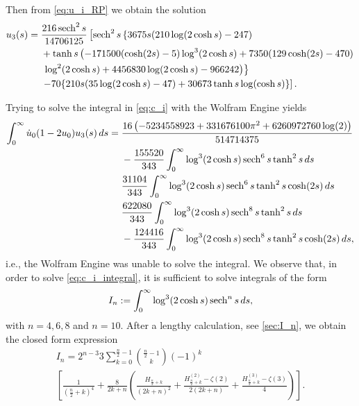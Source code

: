 Then from \cref{eq:u_i_RP} we obtain the solution
\begin{align*}
    u_3(s) ={}&
    \frac{216 \operatorname{sech}^2 s}{14706125}  
    \left[\operatorname{sech}^2 s  \left\{3675 s (210 \log (2 \cosh  s )-247) \right. \right. \\
              & +\tanh  s  \left(-171500 (\cosh (2 s)- 5) \log ^3(2 \cosh  s )+7350 (129 \cosh (2 s)-470) \right. \\
              & \left.\left. \log^2(2 \cosh  s )+4456830 \log (2 \cosh s)-966242\right)\right\} \\
              & \left.-70 \{210 s (35 \log (2 \cosh  s )-47)+30673 \tanh  s \log (\cosh  s )\}\right]
.\end{align*}

Trying to solve the integral in \cref{eq:c_i} with the Wolfram Engine yields
\begin{align}
    \label{eq:c_i_integral}
    \int_0^\infty \dot u_0(1 - 2 u_0)u_3(s) \, ds ={}& 
    \frac{16 \left(-5234558923+331676100 \pi^2+6260972760 \log (2)\right)}{514714375} \\
    &{} -\frac{155520}{343}\int_0^\infty 
                \log^3(2\cosh s )\operatorname{sech}^6 s \tanh^2 s  \, ds \nonumber \\ 
    &{}  \frac{31104}{343}
                \int_0^\infty \log^3(2\cosh s )\operatorname{sech}^6 s \tanh^2 s \cosh(2s) 
                \, ds \nonumber \\
    &{}  \frac{622080}{343}
            \int_0^\infty \log^3(2\cosh s )\operatorname{sech}^8 s \tanh^2 s  
            \, ds \nonumber \\ 
    &{} -\frac{124416}{343}
            \int_0^\infty \log^3(2\cosh s )\operatorname{sech}^8 s \tanh^2 s \cosh(2s) 
            \, ds, \nonumber
\end{align}
i.e., the Wolfram Engine was unable to solve the integral. We observe that, in
order to solve \cref{eq:c_i_integral}, it is sufficient to solve integrals of
the form
\begin{equation}
    \label{eq:I_n}
    I_n := \int_0^{\infty} \log^3 (2 \cosh s) \operatorname{sech}^n s \, ds,
\end{equation}
with $n=4,6,8$ and $n=10$. After a lengthy calculation, see \cref{sec:I_n}, we
obtain the closed form expression
\begin{multline*}
I_n = 2^{n-3} 3 \sum_{k=0}^{\frac{n}{2}-1} \binom{\frac{n}{2}-1}k 
            (-1)^k  \\
        \left[\frac1{(\frac{n}{2}+k)^4} +
            \frac{8}{2k+n} \left(\frac{H_{\frac{n}{2} + k}}{(2k+n)^2}
                + \frac{H^{(2)}_{\frac{n}{2}+k} - \zeta(2)}{2(2k+n)}
            + \frac{H^{(3)}_{\frac{n}{2}+k} - \zeta(3)}{4}
        \right)\right].
\end{multline*}
